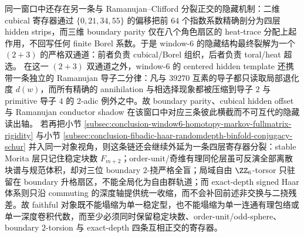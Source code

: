 同一窗口中还存在另一条与 Ramanujan--Clifford 分裂正交的隐藏机制：二维 cubical 寄存器通过 \(\{0,21,34,55\}\) 的偏移把前 \(64\) 个指数系数精确剖分为四层 hidden strips，而三维 boundary parity 仅在八个角色扇区的 heat-trace 分配上起作用，不回写任何 finite Borel 系数。于是 window-\(6\) 的隐藏结构最终裂解为一个 \((2+3)\) 的严格双通道：前者负责 cubical/Borel 组织，后者负责 toral/heat 超选。
在这一 \((2+3)\) 双通道之外，window-\(6\) 的 centered hidden template 还携带一条独立的 Ramanujan 导子二分律：凡与 \(39270\) 互素的导子都只读取局部退化度 \(d(w)\)，而所有精确的 annihilation 与相选择现象都被压缩到导子 \(2\) 与 primitive 导子 \(4\) 的 \(2\)-adic 例外之中。故 boundary parity、cubical hidden offset 与 Ramanujan conductor shadow 在该窗口中对应三条彼此横截而不可互代的隐藏读出轴。
若再把小节 \ref{subsec:conclusion-window6-homotopy-markov-fullmatrix-rigidity} 与小节 \ref{subsec:conclusion-fibadic-haar-randomdepth-binfold-conjugacy-schur} 并入同一对象视角，则这条链还会继续外延为一条四层寄存器分裂：stable Morita 层只记住稳定块数 \(F_{m+2}\)；order-unit/奇维有理同伦层虽可反演全部离散块谱与规范体积，却对三位 boundary \(2\)-挠严格全盲；局域自由 \(\ZZ_6\)-torsor 只驻留在 boundary 升格扇区，不能全局化为自由群轨道；而 exact-depth signed Haar 体系则只沿 commuting 的深度轴提供统一收缩，而不会补回前述非交换与二挠残差。故 faithful 对象既不能塌缩为单一稳定型，也不能塌缩为单一连通有理包络或单一深度卷积代数，而至少必须同时保留稳定块数、order-unit/odd-sphere、boundary \(2\)-torsion 与 exact-depth 四条互相正交的寄存器。

\endinput
